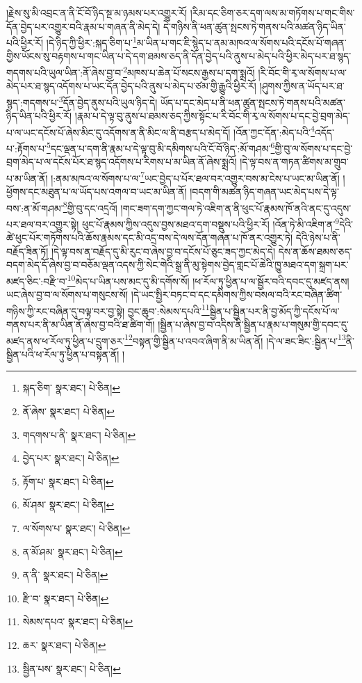 །རྗེས་སུ་མི་འབྲང་ན་ནི་ངོ་བོ་ཉིད་སྔ་མ་ཉམས་པར་འགྱུར་རོ། །རིམ་དང་ཅིག་ཅར་དག་ལས་མ་གཏོགས་པ་གང་གིས་དོན་བྱེད་པར་འགྱུར་བའི་རྣམ་པ་གཞན་ནི་མེད་དེ། དེ་གཉིས་ནི་ཕན་ཚུན་སྤངས་ཏེ་གནས་པའི་མཚན་ཉིད་ཡིན་པའི་ཕྱིར་རོ། །དེ་ཉིད་ཀྱི་ཕྱིར་:སྐད་ཅིག་པ་\footnote{སྐད་ཅིག་  སྣར་ཐང་།  པེ་ཅིན། }མ་ཡིན་པ་གང་ཇི་སྙེད་པ་ནམ་མཁའ་ལ་སོགས་པའི་དངོས་པོ་གཞན་གྱིས་ཡོངས་སུ་བརྟགས་པ་གང་ཡིན་པ་དེ་དག་ཐམས་ཅད་ནི་དོན་བྱེད་པའི་ནུས་པ་མེད་པའི་ཕྱིར་མེད་པར་ཐ་སྙད་གདགས་པའི་ཡུལ་ཡིན་:ནོ་ཞེས་བྱ་བ་\footnote{ནོ་ཞེས་  སྣར་ཐང་།  པེ་ཅིན། }མཁས་པ་ཆེན་པོ་སངས་རྒྱས་པ་དག་སྨྲའོ། །རི་བོང་གི་རྭ་ལ་སོགས་པ་ལ་མེད་པར་ཐ་སྙད་འདོགས་པ་ཡང་དོན་བྱེད་པའི་ནུས་པ་མེད་པ་ཙམ་གྱི་རྒྱུའི་ཕྱིར་རོ། །ཤུགས་ཀྱིས་ན་ཡོད་པར་ཐ་སྙད་:གདགས་པ་\footnote{གདགས་པ་ནི་  སྣར་ཐང་།  པེ་ཅིན། }དོན་བྱེད་ནུས་པའི་ཡུལ་ཉིད་དེ། ཡོད་པ་དང་མེད་པ་ནི་ཕན་ཚུན་སྤངས་ཏེ་གནས་པའི་མཚན་ཉིད་ཡིན་པའི་ཕྱིར་རོ། །རྣམ་པ་དེ་ལྟ་བུ་ནུས་པ་ཐམས་ཅད་ཀྱིས་སྟོང་པ་རི་བོང་གི་རྭ་ལ་སོགས་པ་དང་བྱེ་བྲག་མེད་པ་ལ་ཡང་དངོས་པོ་ཞེས་མིང་དུ་འདོགས་ན་ནི་མིང་ལ་ནི་བརྩད་པ་མེད་དོ། །འོན་ཀྱང་དོན་:མེད་པའི་\footnote{བྱེད་པར་  སྣར་ཐང་།  པེ་ཅིན། }འདོད་པ་:རྟོགས་པ་\footnote{རྟོག་པ་  སྣར་ཐང་།  པེ་ཅིན། }དང་ལྡན་པ་དག་ནི་རྣམ་པ་དེ་ལྟ་བུ་མི་དམིགས་པའི་ངོ་བོ་ཉིད་:མོ་གཤམ་\footnote{མོ་ཤམ་  སྣར་ཐང་།  པེ་ཅིན། }གྱི་བུ་ལ་སོགས་པ་དང་བྱེ་བྲག་མེད་པ་ལ་དངོས་པོར་ཐ་སྙད་འདོགས་པ་རིགས་པ་མ་ཡིན་ནོ་ཞེས་སྨྲའོ། །དེ་ལྟ་བས་ན་གཏན་ཚིགས་མ་གྲུབ་པ་མ་ཡིན་ནོ། །:ནམ་མཁའ་ལ་སོགས་པ་ལ་\footnote{ལ་སོགས་པ་  སྣར་ཐང་།  པེ་ཅིན། }ཡང་བྱེད་པ་པོར་ཐལ་བར་འགྱུར་བས་མ་ངེས་པ་ཡང་མ་ཡིན་ནོ། །ཕྱོགས་དང་མཐུན་པ་ལ་ཡོད་པས་འགལ་བ་ཡང་མ་ཡིན་ནོ། །བདག་གི་མཚན་ཉིད་གཞན་ཡང་མེད་པས་དེ་ལྟ་བས་:ན་མོ་གཤམ་\footnote{ན་མོ་ཤམ་  སྣར་ཐང་།  པེ་ཅིན། }གྱི་བུ་དང་འདྲའོ། །གང་ཟག་དག་ཀྱང་གལ་ཏེ་འཇིག་ན་ནི་ཕུང་པོ་རྣམས་ཁོ་ནའི་ནང་དུ་འདུས་པར་ཐལ་བར་འགྱུར་སྟེ། ཕུང་པོ་རྣམས་ཀྱིས་འདུས་བྱས་མཐའ་དག་བསྡུས་པའི་ཕྱིར་རོ། །འོན་ཏེ་མི་འཇིག་ན་\footnote{ན་ནི་  སྣར་ཐང་།  པེ་ཅིན། }དེའི་ཚེ་ཕུང་པོར་གཏོགས་པའི་ཆོས་རྣམས་དང་མི་འདྲ་བས་དེ་ལས་དོན་གཞན་པ་ཁོ་ནར་འགྱུར་ཏེ། དེའི་ཉེས་པ་ནི་བརྗོད་ཟིན་ཏོ། །དེ་ལྟ་བས་ན་བརྗོད་དུ་མི་རུང་བ་ཞེས་བྱ་བ་དངོས་པོ་ཅུང་ཟད་ཀྱང་མེད་དེ། དེས་ན་ཆོས་ཐམས་ཅད་བདག་མེད་དོ་ཞེས་བྱ་བ་བཅོམ་ལྡན་འདས་ཀྱི་སེང་གེའི་སྒྲ་ནི་མུ་སྟེགས་བྱེད་གླང་པོ་ཆེའི་ཁྱུ་མཐའ་དག་སྐྲག་པར་མཛད་ཅིང་:བརྫི་བ་\footnote{རྫི་བ་  སྣར་ཐང་།  པེ་ཅིན། }མེད་པ་ཡིན་པས་མང་དུ་མི་དགོས་སོ། །ཕ་རོལ་ཏུ་ཕྱིན་པ་ལ་སྦྱོར་བའི་དབང་དུ་མཛད་ནས། ཡང་ཞེས་བྱ་བ་ལ་སོགས་པ་གསུངས་སོ། །དེ་ཡང་སྤྱིར་བཏང་བ་དང་དམིགས་ཀྱིས་བསལ་བའི་རང་བཞིན་ཚིག་གཉིས་ཀྱི་རང་བཞིན་དུ་བལྟ་བར་བྱ་སྟེ། བྱང་ཆུབ་:སེམས་དཔའི་\footnote{སེམས་དཔའ་  སྣར་ཐང་།  པེ་ཅིན། }སྦྱིན་པ་སྦྱིན་པར་ནི་བྱ་མོད་ཀྱི་དངོས་པོ་ལ་གནས་པར་ནི་མ་ཡིན་ནོ་ཞེས་བྱ་བའི་ཐ་ཚིག་གོ། །སྦྱིན་པ་ཞེས་བྱ་བ་འདིས་ནི་སྦྱིན་པ་རྣམ་པ་གསུམ་གྱི་དབང་དུ་མཛད་ནས་ཕ་རོལ་ཏུ་ཕྱིན་པ་དྲུག་ཅར་\footnote{ཆར་  སྣར་ཐང་།  པེ་ཅིན། }བསྟན་གྱི་སྦྱིན་པ་འབའ་ཞིག་ནི་མ་ཡིན་ནོ། །དེ་ལ་ཟང་ཟིང་:སྦྱིན་པ་\footnote{སྦྱིན་པས་  སྣར་ཐང་།  པེ་ཅིན། }ནི་སྦྱིན་པའི་ཕ་རོལ་ཏུ་ཕྱིན་པ་བསྟན་ནོ། །

